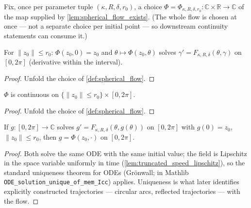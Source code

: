 \begin{definition}

  \label{def:spherical_flow}
  Fix, once per parameter tuple $(\kappa,R,\delta,r_0)$, a choice
  $\Phi=\Phi_{\kappa,R,\delta,r_0}:\mathbb C\times\mathbb R\to\mathbb C$ of the map
  supplied by \cref{lem:spherical_flow_exists}. (The whole flow is chosen at once — not a
  separate choice per initial point — so downstream continuity statements can consume it.)
\end{definition}

\begin{lemma}

  \label{lem:spherical_flow_spec}
  For $\|z_0\|\le r_0$: $\Phi(z_0,0)=z_0$ and $\theta\mapsto\Phi(z_0,\theta)$ solves
  $\gamma'=F_{\kappa,R,\delta}(\theta,\gamma)$ on $[0,2\pi]$ (derivative within the interval).
\end{lemma}

\begin{proof}

\leanok
  Unfold the choice of \cref{def:spherical_flow}.
\end{proof}

\begin{lemma}

  \label{lem:spherical_flow_continuousOn}
  $\Phi$ is continuous on $\{\|z_0\|\le r_0\}\times[0,2\pi]$.
\end{lemma}

\begin{proof}

\leanok
  Unfold the choice of \cref{def:spherical_flow}.
\end{proof}

\begin{lemma}

  \label{lem:spherical_flow_unique}
  If $g:[0,2\pi]\to\mathbb C$ solves $g'=F_{\kappa,R,\delta}(\theta,g(\theta))$ on
  $[0,2\pi]$ with $g(0)=z_0$, $\|z_0\|\le r_0$, then $g=\Phi(z_0,\cdot)$ on $[0,2\pi]$.
\end{lemma}

\begin{proof}

\leanok
  Both solve the same ODE with the same initial value; the field is Lipschitz in the space
  variable uniformly in time (\cref{lem:truncated_speed_lipschitz}), so the standard
  uniqueness theorem for ODEs (Gr\"onwall; in Mathlib
  \texttt{ODE\_solution\_unique\_of\_mem\_Icc}) applies. Uniqueness is what later
  identifies explicitly constructed trajectories — circular arcs, reflected trajectories —
  with the flow.
\end{proof}

